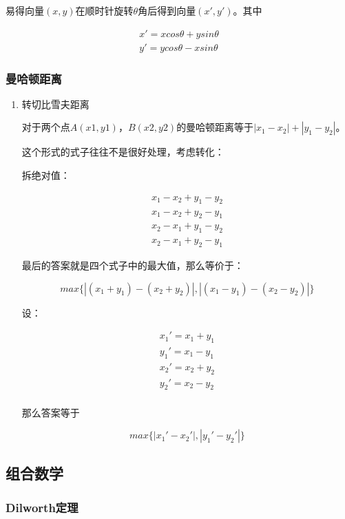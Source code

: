\documentclass[11pt]{article}
\begin{document}
易得向量\((x,y)\)在顺时针旋转\(\theta\)角后得到向量\((x',y')\)。其中

\[\begin{aligned}
x'=xcos \theta+ysin\theta \\
y'=ycos \theta-xsin\theta
\end{aligned}\]

\subsubsection{曼哈顿距离}
\label{sec:org87a22ba}
\begin{enumerate}
\item 转切比雪夫距离
\label{sec:orgc0d4c01}

对于两个点\(A(x1,y1)\)，\(B(x2,y2)\)的曼哈顿距离等于\(|x_1-x_2|+|y_1-y_2|\)。  

这个形式的式子往往不是很好处理，考虑转化：

拆绝对值：

\[\begin{aligned}
x_1-x_2+y_1-y_2 \\
x_1-x_2+y_2-y_1 \\
x_2-x_1+y_1-y_2 \\
x_2-x_1+y_2-y_1
\end{aligned}\]

最后的答案就是四个式子中的最大值，那么等价于：

\[
max\{|(x_1+y_1)-(x_2+y_2)|,|(x_1-y_1)-(x_2-y_2)|\}
\]

设：

\[\begin{aligned}
x_1'=x_1+y_1 \\
y_1'=x_1-y_1 \\
x_2'=x_2+y_2 \\
y_2'=x_2-y_2 \\
\end{aligned}\]

那么答案等于

\[
max\{|x_1'-x_2'|,|y_1'-y_2'|\}
\]
\end{enumerate}

\subsection{组合数学}
\label{sec:orgd5a6b45}
\subsubsection{Dilworth定理}
\label{sec:orgc906af4}
\end{document}
